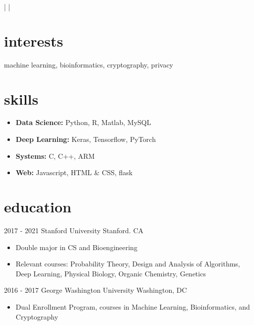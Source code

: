 \documentclass[]{resume}
\begin{document}
\thispagestyle{empty}
       {\href{njw.fish}{\color{white}{njw.fish}} | \href{tel:+19199951050}{\color{white}{(919) 995-1050}} | \href{mailto:njwfish@stanford.edu}{\color{white}{njwfish@stanford.edu}} }



\begin{multicols}{2}
\section{interests}
machine learning, bioinformatics, cryptography, privacy

\par\vspace{-\parskip}
\vspace{2mm}

\section{skills}

\begin{itemize}
	\item {\bf Data Science:} Python, R, Matlab, MySQL
	\item {\bf Deep Learning:} Keras, Tensorflow, PyTorch
	\item {\bf Systems:} C, C++, ARM
	\item {\bf Web:} Javascript, HTML \& CSS, flask
\end{itemize}


\section{education}

\begin{entrylist}

  \entry
    {2017 - 2021}
    {Stanford University}
    {Stanford. CA}
    {\begin{itemize}[leftmargin=*]
	      \item Double major in CS and Bioengineering
	      \item Relevant courses: Probability Theory, Design and Analysis of Algorithms, Deep Learning, Physical Biology, Organic Chemistry, Genetics
	 \end{itemize}}

  \entry
    {2016 - 2017}
    {George Washington University}
    {Washington, DC}
    {\begin{itemize}[leftmargin=*]
	      \item Dual Enrollment Program, courses in Machine Learning, Bioinformatics, and Cryptography
     \end{itemize}}
    

\end{entrylist}
\end{multicols}
\end{document}
